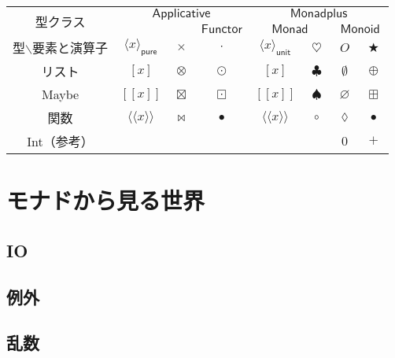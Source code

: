 \documentclass[twocolumn]{jsbook}
\def\[{[\![}
\def\]{]\!]}
\newcommand{\hsklTypeclass}[1]{\mathsf{#1}}
\DeclareMathOperator{\hsklApplicativeMap}{\times}
\DeclareMathOperator{\hsklApplicativeListMap}{\otimes}
\DeclareMathOperator{\hsklApplicativeMaybeMap}{\boxtimes}
\DeclareMathOperator{\hsklFmap}{\cdot}
\DeclareMathOperator{\hsklMap}{\odot}
\DeclareMathOperator{\hsklMaybeAppend}{\boxplus}
\DeclareMathOperator{\hsklMaybeMap}{\boxdot}
\DeclareMathOperator{\hsklMonadMap}{\heartsuit}
\newcommand{\hsklAppend}{\oplus}
\newcommand{\hsklApplicative}{\hsklTypeclass{Applicative}}
\newcommand{\hsklEmptyList}{\emptyset}
\newcommand{\hsklFunctor}{\hsklTypeclass{Functor}}
\newcommand{\hsklMonad}{\hsklTypeclass{Monad}}
\newcommand{\hsklMonadplus}{\hsklTypeclass{Monadplus}}
\newcommand{\hsklMonoid}{\hsklTypeclass{Monoid}}
\newcommand{\hsklNothing}{\varnothing}
\newcommand{\hsklJust}[1]{\[#1\]}
\newcommand{\hsklPure}[1]{\langle#1\rangle_\textsf{pure}}
\newcommand{\hsklUnit}[1]{\langle#1\rangle_\textsf{unit}}
\DeclareMathOperator{\mathAnyBinaryOperator}{\bigstar}
\DeclareMathOperator{\mathCompose}{\bullet}
\newcommand{\mathLambdaAnonymousParameter}{\lozenge}
\begin{document}
\begin{table*}
\begin{center}
\begin{tabular}{||c||c|c|c|c|c|c|c||}
\hline
\multirow{2}{*}{型クラス}
    &\multicolumn{3}{|c|}{$\hsklApplicative$}
    &\multicolumn{4}{|c||}{$\hsklMonadplus$}\\
\cline{4-8}
\multirow{1}{*}{}
    &\multicolumn{2}{|c|}{ }
    &$\hsklFunctor$
    &\multicolumn{2}{|c}{$\hsklMonad$}
    &\multicolumn{2}{|c||}{$\hsklMonoid$}\\
\hline\hline
型$\backslash$要素と演算子
    &$\hsklPure{x}$
    &$\hsklApplicativeMap$
    &$\hsklFmap$
    &$\hsklUnit{x}$
    &$\hsklMonadMap$
    &$O$
    &$\mathAnyBinaryOperator$\\
\hline
リスト
    &$[x]$
    &$\hsklApplicativeListMap$
    &$\hsklMap$
    &$[x]$
    &$\clubsuit$
    &$\hsklEmptyList$
    &$\hsklAppend$\\
\hline
Maybe
    &$\hsklJust{x}$
    &$\hsklApplicativeMaybeMap$
    &$\hsklMaybeMap$
    &$\hsklJust{x}$
    &$\spadesuit$
    &$\hsklNothing$
    &$\hsklMaybeAppend$\\
\hline
関数
    &$\langle\!\langle x\rangle\!\rangle$
    &$\bowtie$
    &$\mathCompose$
    &$\langle\!\langle x\rangle\!\rangle$
    &$\circ$
    &$\mathLambdaAnonymousParameter$
    &$\mathCompose$\\
\hline
Int（参考）
    &
    &
    &
    &
    &
    &$0$
    &$+$\\
\hline
\end{tabular}
\end{center}
\end{table*}

\part{モナドから見る世界}

\chapter{IO}

\chapter{例外}

\chapter{乱数}
\end{document}
